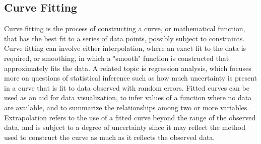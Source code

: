\documentclass{article}
\begin{document}
\subsection{Curve Fitting}
\par{Curve fitting is the process of constructing a curve, or mathematical function, that has the best fit to a series of data points, possibly subject to constraints. Curve fitting can involve either interpolation, where an exact fit to the data is required, or smoothing, in which a "smooth" function is constructed that approximately fits the data. A related topic is regression analysis, which focuses more on questions of statistical inference such as how much uncertainty is present in a curve that is fit to data observed with random errors. Fitted curves can be used as an aid for data visualization, to infer values of a function where no data are available,  and to summarize the relationships among two or more variables. Extrapolation refers to the use of a fitted curve beyond the range of the observed data,  and is subject to a degree of uncertainty since it may reflect the method used to construct the curve as much as it reflects the observed data.}
\end{document}
